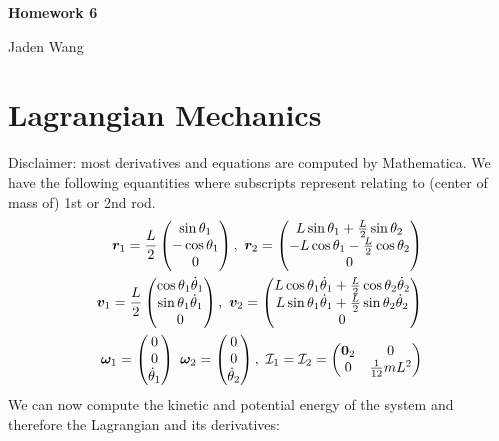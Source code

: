 \documentclass[11pt]{article}
\begin{document}
\centerline {\textsf{\textbf{\LARGE{Homework 6}}}}
\centerline {Jaden Wang}
\vspace{.15in}
\section{Lagrangian Mechanics}
Disclaimer: most derivatives and equations are computed by Mathematica. We have the following equantities where subscripts represent relating to (center of mass of) 1st or 2nd rod.
\begin{align*}
	{\bm{ r}}_1 = \frac{L}{2} \begin{pmatrix} \sin \theta_1 \\ -\cos \theta_1 \\0 \end{pmatrix} ,   \ {\bm{ r}}_2 = \begin{pmatrix} L \sin \theta_1 + \frac{L}{2} \sin \theta_2\\ -L \cos \theta_1 - \frac{L}{2} \cos \theta_2 \\0 \end{pmatrix}  \\
	{\bm{ v}}_1 = \frac{L}{2} \begin{pmatrix} \cos \theta_1 \dot{\theta}_1\\ \sin \theta_1 \dot{\theta}_1 \\0 \end{pmatrix}, \ {\bm{ v}}_2 = \begin{pmatrix} L \cos \theta_1 \dot{\theta}_1 + \frac{L}{2} \cos \theta_2 \dot{\theta}_2 \\L \sin \theta_1 \dot{\theta}_1 + \frac{L}{2} \sin \theta_2 \dot{\theta}_2\\0 \end{pmatrix} \\
	 {\bm{ \omega}}_1 = \begin{pmatrix} 0\\0\\ \dot{\theta}_1 \end{pmatrix} \ {\bm{ \omega}}_2 = \begin{pmatrix} 0\\0\\ \dot{\theta}_2 \end{pmatrix}, \  \mathcal{ I}_1 = \mathcal{ I}_2= \begin{pmatrix} {\bm{ 0}}_2 &0\\0& \frac{1}{12} m L^2 \end{pmatrix} 
\end{align*}
We can now compute the kinetic and potential energy of the system and therefore the Lagrangian and its derivatives:
\end{document}
